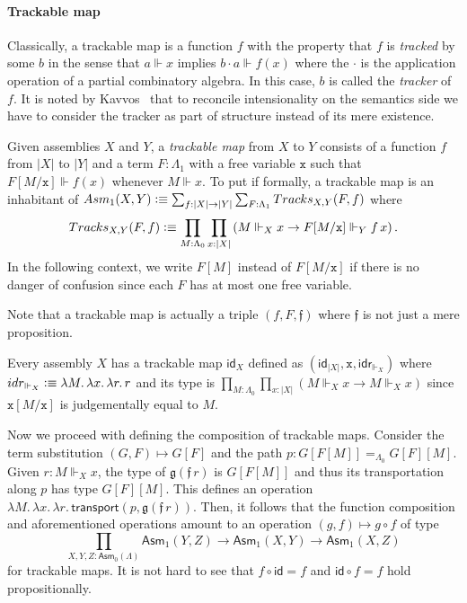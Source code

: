 \documentclass[a4paper,UKenglish,numberwithinsect,cleveref,thm-restate]{lipics-v2021}
\newcommand{\Asm}{\mathsf{Asm}}
\newcommand{\defeq}{\vcentcolon\equiv}
\newcommand{\id}{\mathsf{id}}
\theoremstyle{plain}
\begin{document}
\paragraph*{Trackable map}%
Classically, a trackable map is a function $f$ with the property that $f$ is \emph{tracked} by some $b$ in the sense that $a \Vdash x$ implies $b \cdot a \Vdash f(x)$ where the $\cdot$ is the application operation of a partial combinatory algebra. In this case, $b$ is called the \emph{tracker} of $f$.
It is noted by Kavvos~\cite{Kavvos2017b} that to reconcile intensionality on the semantics side we have to consider the tracker as part of structure instead of its mere existence.
\begin{definition}\label{def:trackable}
  Given assemblies $X$ and $Y$, a \emph{trackable map} from $X$ to $Y$ consists of a function $f$ from $|X|$ to $|Y|$ and a term $F : \Lambda_1$ with a free variable $\mathtt{x}$ such that $F[M/\mathtt{x}] \Vdash f(x)$ whenever $M \Vdash x$.
  To put if formally, a trackable map is an inhabitant of $\Asm_1(X, Y) \defeq \sum_{f : |X| \to |Y|} \sum_{F : \Lambda_1} \mathsf{Tracks}_{X, Y}(F, f)$ where
  \[
    \mathsf{Tracks}_{X, Y}(F, f) \defeq \prod_{M : \Lambda_0} \prod_{x : |X|}
    \left( M \Vdash_X x \to F[M/\mathtt{x}] \Vdash_Y f\, x \right).
  \]
  In the following context, we write $F[M]$ instead of $F[M/\mathtt{x}]$ if there is no danger of confusion since each $F$ has at most one free variable.
\end{definition}
Note that a trackable map is actually a triple $(f, F, \mathfrak{f})$ where $\mathfrak{f}$ is not just a mere proposition.

\begin{example}
  Every assembly $X$ has a trackable map $\id_X$ defined as $(\mathsf{id}_{|X|}, \mathtt{x}, \mathsf{idr}_{\Vdash_X})$
  where $\mathsf{idr}_{\Vdash_X} \defeq \lambda M.\,\lambda x.\,\lambda r.\, r$ and its type is
    $\prod_{M : \Lambda_0} \prod_{x : |X|} \left( M \Vdash_X x \to M  \Vdash_X x  \right)$
  since $\mathtt{x}[M/\mathtt{x}]$ is judgementally equal to $M$.
\end{example}
Now we proceed with defining the composition of trackable maps. Consider the term substitution $(G, F)
\mapsto G [ F ]$ and the path $p : G[F[M]] =_{\Lambda_0} G[F] [M]$.
Given $r : M \Vdash_X x$, the type of $\mathfrak{g}(\mathfrak{f}\,r)$ is $G[F[M]]$ and thus its transportation along $p$ has type $G[F][M]$.
This defines an operation $\lambda M.\,\lambda x.\,\lambda r.\, \mathsf{transport}(p, \mathfrak{g}(\mathfrak{f}\,r))$.
Then, it follows that the function composition and aforementioned operations amount to an operation $(g, f) \mapsto g \circ f$ of type
\[
  \prod_{X, Y, Z : \Asm_0(\Lambda)} \Asm_1(Y, Z) \to \Asm_1(X, Y) \to \Asm_1(X, Z)
\]
for trackable maps. It is not hard to see that $f \circ \id = f$ and $\id \circ f = f$ hold propositionally.
\end{document}
